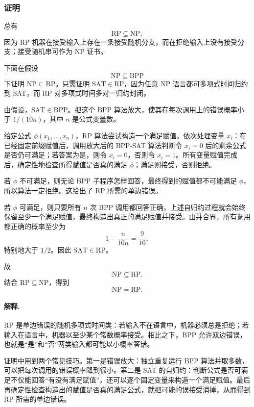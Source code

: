 \begin{answerred}
\subsubsection*{证明}

总有
\[
\mathrm{RP}\subseteq\mathrm{NP},
\]
因为 RP 机器在接受输入上存在一条接受随机分支，而在拒绝输入上没有接受分支；接受随机串可作为 NP 证书。

下面在假设
\[
\mathrm{NP}\subseteq\mathrm{BPP}
\]
下证明 $\mathrm{NP}\subseteq\mathrm{RP}$。只需证明 $\mathrm{SAT}\in\mathrm{RP}$，因为任意 NP 语言都可多项式时间归约到 SAT，而 RP 对多项式时间多对一归约封闭。

由假设，$\mathrm{SAT}\in\mathrm{BPP}$。把这个 BPP 算法放大，使其在每次调用上的错误概率小于 $1/(10n)$，其中 $n$ 是公式变量数。

给定公式 $\phi(x_1,\ldots,x_n)$，RP 算法尝试构造一个满足赋值。依次处理变量 $x_i$：在已经固定前缀赋值后，调用放大后的 BPP-SAT 算法判断令 $x_i=0$ 后的剩余公式是否仍可满足；若答案为是，则令 $x_i=0$，否则令 $x_i=1$。所有变量赋值完成后，确定性地检查所得赋值是否真的满足 $\phi$；满足则接受，否则拒绝。

若 $\phi$ 不可满足，则无论 BPP 子程序怎样回答，最终得到的赋值都不可能满足 $\phi$，所以算法一定拒绝。这给出了 RP 所需的单边错误。

若 $\phi$ 可满足，则只要所有 $n$ 次 BPP 调用都回答正确，上述自归约过程就会始终保留至少一个满足赋值，最终构造出真正的满足赋值并接受。由并合界，所有调用都正确的概率至少为
\[
1-\frac{n}{10n}=\frac9{10},
\]
特别地大于 $1/2$。因此 $\mathrm{SAT}\in\mathrm{RP}$。

故
\[
\mathrm{NP}\subseteq\mathrm{RP}.
\]
结合 $\mathrm{RP}\subseteq\mathrm{NP}$，得到
\[
\mathrm{NP}=\mathrm{RP}.
\]

\begin{answernote}
\paragraph{解释.}
$\mathrm{RP}$ 是单边错误的随机多项式时间类：若输入不在语言中，机器必须总是拒绝；若输入在语言中，机器以至少某个常数概率接受。相比之下，$\mathrm{BPP}$ 允许双边错误，也就是“是”和“否”两类输入都可能以小概率答错。

证明中用到两个常见技巧。第一是错误放大：独立重复运行 BPP 算法并取多数，可以把每次调用的错误概率降到很小。第二是 SAT 的自归约：判断公式是否可满足不仅能回答“有没有满足赋值”，还可以逐个固定变量来构造一个满足赋值。最后再确定性检查构造出的赋值是否真的满足公式，就把可能的误接受消掉，从而得到 RP 所需的单边错误。

\end{answernote}
\end{answerred}

\clearpage
